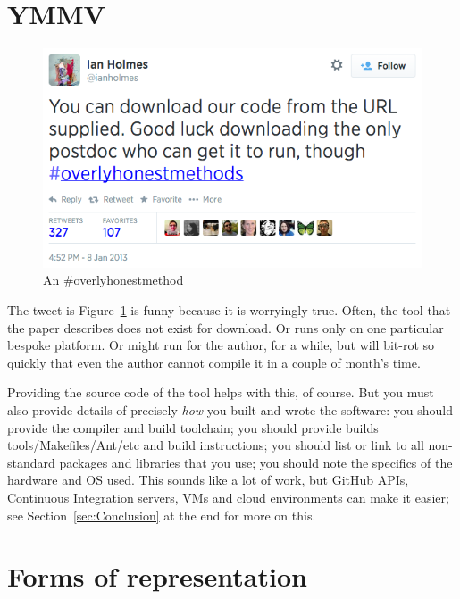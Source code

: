 \documentclass[conference]{IEEEtran}
\begin{document}
\section{YMMV}

\begin{figure}[!ht]
\centering
\includegraphics[width=\columnwidth]{overlyhonesttweet.png}
\caption{An \#overlyhonestmethod}
\label{fig:overlyhonestmethod} 
\end{figure}

The tweet is Figure~\ref{fig:overlyhonestmethod} is funny because it
is worryingly true. Often, the tool that the paper describes does not
exist for download. Or runs only on one particular bespoke
platform. Or might run for the author, for a while, but will bit-rot
so quickly that even the author cannot compile it in a couple of
month's time.

Providing the source code of the tool helps with this, of course. But
you must also provide details of precisely \emph{how} you built and
wrote the software:
%
you should provide the compiler and build toolchain; 
%
you should provide builds tools/Makefiles/Ant/etc and build instructions; 
%
you should list or link to all non-standard packages and libraries that you use; 
%
you should note the specifics of the hardware and OS used. 
%
This sounds like a lot of work, but GitHub APIs, Continuous
Integration servers, VMs and cloud environments can make it easier; see
Section~\ref{sec:Conclusion} at the end for more on this.


\section{Forms of representation}
\end{document}
